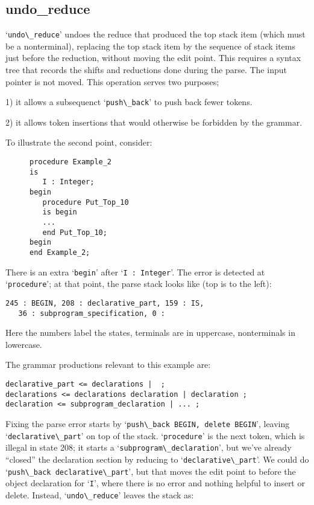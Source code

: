 \documentclass{article}
\newcommand{\code}[1]{`\lstinline|#1|'}
\begin{document}
\subsection{undo\_reduce}
\code{undo\_reduce} undoes the reduce that produced the top stack item
(which must be a nonterminal), replacing the top stack item by the
sequence of stack items just before the reduction, without
moving the edit point. This requires a syntax tree that records the
shifts and reductions done during the parse. The input pointer is not
moved. This operation serves two purposes;

1) it allows a subsequenct \code{push\_back} to push back fewer tokens.

2) it allows token insertions that would otherwise be forbidden by the
grammar.

To illustrate the second point, consider:
\begin{figure}[H]
\begin{lstlisting}
procedure Example_2
is
   I : Integer;
begin
   procedure Put_Top_10
   is begin
   ...
   end Put_Top_10;
begin
end Example_2;
\end{lstlisting}
\caption{}
\label{ex:extra_begin_2}
\end{figure}
There is an extra \code{begin} after
\code{I : Integer}. The error is detected at \code{procedure}; at that point,
the parse stack looks like (top is to the left):
\begin{verbatim}
245 : BEGIN, 208 : declarative_part, 159 : IS,
   36 : subprogram_specification, 0 :
\end{verbatim}
Here the numbers label the states, terminals are in uppercase,
nonterminals in lowercase.

The grammar productions relevant to this example are:
\begin{verbatim}
declarative_part <= declarations |  ;
declarations <= declarations declaration | declaration ;
declaration <= subprogram_declaration | ... ;
\end{verbatim}

Fixing the parse error starts by \code{push\_back BEGIN, delete BEGIN},
leaving \code{declarative\_part} on top of the stack. \code{procedure}
is the next token, which is illegal in state 208; it starts a
\code{subprogram\_declaration}, but we've already ``closed'' the
declaration section by reducing to \code{declarative\_part}. We could
do \code{push\_back declarative\_part}, but that moves the edit point to
before the object declaration for \code{I}, where there is no error
and nothing helpful to insert or delete. Instead, \code{undo\_reduce}
leaves the stack as:
\end{document}
